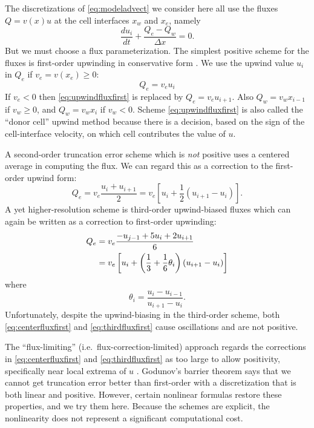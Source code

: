 \documentclass[gmd]{copernicus}   %
\begin{document}
The discretizations of \eqref{eq:modeladvect} we consider here all use the fluxes $Q=v(x) u$ at the cell interfaces $x_w$ and $x_e$, namely
\begin{equation}
\frac{du_i}{dt} + \frac{Q_e - Q_w}{\Delta x} = 0. \label{eq:basicmodelFD}
\end{equation}
But we must choose a flux parameterization.  The simplest positive scheme for the fluxes is first-order upwinding in conservative form \citep[section I.4.3]{HundsdorferVerwer2010}.  We use the upwind value $u_i$ in $Q_e$ if $v_e = v(x_e) \ge 0$:
\begin{equation}
Q_e = v_e u_i \label{eq:upwindfluxfirst}
\end{equation}
If $v_e < 0$ then \eqref{eq:upwindfluxfirst} is replaced by $Q_e = v_e u_{i+1}$. 
Also $Q_w = v_w x_{i-1}$ if $v_w \ge 0$, and $Q_w = v_w x_{i}$ if $v_w < 0$.  Scheme \eqref{eq:upwindfluxfirst} is also called the ``donor cell'' upwind method \citep{LeVeque} because there is a decision, based on the sign of the cell-interface velocity, on which cell contributes the value of $u$.

A second-order truncation error scheme which is \emph{not} positive uses a centered average in computing the flux.  We can regard this as a correction to the first-order upwind form:
\begin{equation}
Q_e = v_e \frac{u_i+u_{i+1}}{2} = v_e \left[u_i + \frac{1}{2} (u_{i+1} - u_i)\right]. \label{eq:centerfluxfirst}
\end{equation}
A yet higher-resolution scheme is third-order upwind-biased fluxes which can again be written as a correction to first-order upwinding:
\begin{align}
Q_e &= v_e \frac{-u_{j-1} + 5 u_i + 2 u_{i+1}}{6} \notag \\
    &= v_e \left[u_i + \left(\frac{1}{3}+\frac{1}{6} \theta_i \right) (u_{i+1} - u_i)\right]  \label{eq:thirdfluxfirst}
\end{align}
where
\begin{equation}
\theta_i = \frac{u_{i} - u_{i-1}}{u_{i+1} - u_i}.  \label{eq:thetadefine}
\end{equation}
Unfortunately, despite the upwind-biasing in the third-order scheme, both \eqref{eq:centerfluxfirst} and \eqref{eq:thirdfluxfirst} cause oscillations and are not positive.

The ``flux-limiting'' (i.e.~flux-correction-limited) approach regards the corrections in \eqref{eq:centerfluxfirst} and \eqref{eq:thirdfluxfirst} as too large to allow positivity, specifically near local extrema of $u$ \citep[section III.1.1]{HundsdorferVerwer2010}.  Godunov's barrier theorem \citep[section I.7.1]{HundsdorferVerwer2010} says that we cannot get truncation error better than first-order with a discretization that is both linear and positive.  However, certain nonlinear formulas restore these properties, and we try them here.  Because the schemes are explicit, the nonlinearity does not represent a significant computational cost.
\end{document}
